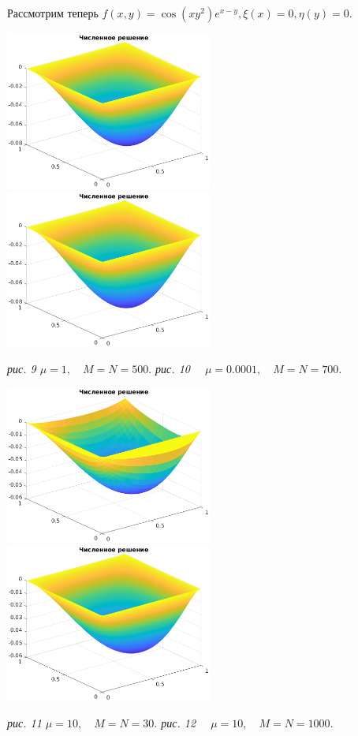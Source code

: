 \documentclass[11pt]{article}
\begin{document}
\newpage
Рассмотрим теперь $f(x, y) = \cos(xy^2)e^{x-y}, \xi(x) = 0, \eta(y) = 0$. 

\noindent
\includegraphics[width=0.51\textwidth]{some5.eps}
\includegraphics[width=0.51\textwidth]{some6.eps}
\begin{center}
\it{рис. 9 \quad $\mu = 1, \quad M = N = 500.$ \qquad \qquad \qquad \qquad  рис. 10 $\quad \mu = 0.0001, \quad M = N = 700.$}
\end{center}

\noindent
\includegraphics[width=0.51\textwidth]{some7.eps}
\includegraphics[width=0.51\textwidth]{some8.eps}
\begin{center}
\it{рис. 11 \quad $\mu = 10, \quad M = N = 30.$ \qquad \qquad \qquad \qquad  рис. 12 $\quad \mu = 10, \quad M = N = 1000.$}
\end{center}
\end{document}
